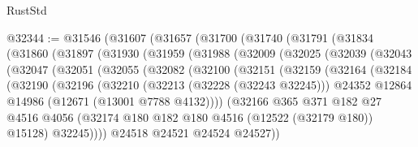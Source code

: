 \begin{lexlean}{RustStd}
\begin{coremodule}
@32344 := @31546
    (@31607
      (@31657
        (@31700
          (@31740
            (@31791
              (@31834
                (@31860
                  (@31897
                    (@31930
                      (@31959
                        (@31988
                          (@32009
                            (@32025
                              (@32039
                                (@32043
                                  (@32047
                                    (@32051
                                      (@32055
                                        (@32082
                                          (@32100
                                            (@32151
                                              (@32159
                                                (@32164
                                                  (@32184
                                                    (@32190
                                                      (@32196
                                                        (@32210
                                                          (@32213 (@32228 (@32243 @32245)))
                                                          @24352
                                                          @12864
                                                          @14986
                                                          (@12671 (@13001 @7788 @4132))))
                                                      (@32166
                                                        @365
                                                        @371
                                                        @182
                                                        @27
                                                        @4516
                                                        @4056
                                                        (@32174
                                                          @180
                                                          @182
                                                          @180
                                                          @4516
                                                          (@12522 (@32179 @180))
                                                          @15128)
                                                        @32245))))
                                                @24518
                                                @24521
                                                @24524
                                                @24527))

\end{coremodule}
\end{lexlean}
